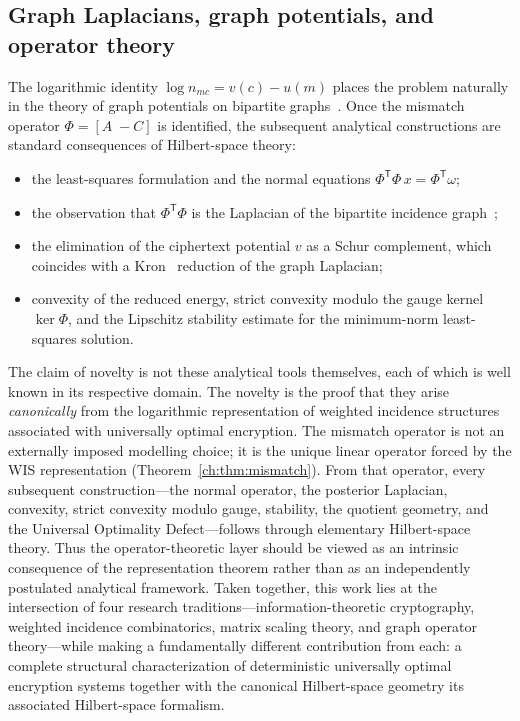 \subsection*{Graph Laplacians, graph potentials, and operator theory}
The logarithmic identity $\log n_{mc}=v(c)-u(m)$ places the problem
naturally in the theory of graph potentials on bipartite
graphs~\cite{bollobas1998modern,zaslavsky1998signed}.  Once the mismatch
operator $\Phi=[A\;-C]$ is identified, the subsequent analytical
constructions are standard consequences of Hilbert-space theory:
\begin{itemize}
\item the least-squares formulation and the normal equations
      $\Phi^{\mathsf T}\Phi\,x=\Phi^{\mathsf T}\omega$;
\item the observation that $\Phi^{\mathsf T}\Phi$ is the Laplacian
      of the bipartite incidence graph~\cite{chung1997spectral};
\item the elimination of the ciphertext potential $v$ as a Schur
      complement, which coincides with a
      Kron~\cite{kron1939tensor} reduction of the graph Laplacian;
\item convexity of the reduced energy, strict convexity modulo the
      gauge kernel $\ker\Phi$, and the Lipschitz stability estimate
      for the minimum-norm least-squares solution.
\end{itemize}
The claim of novelty is not these analytical tools themselves, each
of which is well known in its respective domain.  The novelty is the
proof that they arise \emph{canonically} from the logarithmic
representation of weighted incidence structures associated with
universally optimal encryption.  The mismatch operator is not an
externally imposed modelling choice; it is the unique linear operator
forced by the WIS representation (Theorem~\ref{ch:thm:mismatch}).  From
that operator, every subsequent construction---the normal operator,
the posterior Laplacian, convexity, strict convexity modulo gauge,
stability, the quotient geometry, and the Universal Optimality
Defect---follows through elementary Hilbert-space theory.  Thus the
operator-theoretic layer should be viewed as an intrinsic consequence
of the representation theorem rather than as an independently
postulated analytical framework.
Taken together, this work lies at the intersection of four research
traditions---information-theoretic cryptography, weighted incidence
combinatorics, matrix scaling theory, and graph operator theory---while
making a fundamentally different contribution from each: a complete
structural characterization of deterministic universally optimal
encryption systems together with the canonical Hilbert-space geometry
its associated Hilbert-space formalism.
